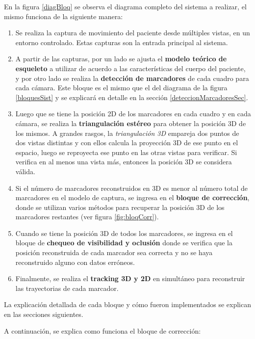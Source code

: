 En la figura \ref{diagBloq} se observa el diagrama completo del sistema a realizar, el mismo funciona de la siguiente manera:
\begin{enumerate}
\item Se realiza la captura de movimiento del paciente desde múltiples vistas, en un entorno controlado. Estas capturas son la entrada principal al sistema.
\item A partir de las capturas, por un lado se ajusta el \textbf{modelo teórico de esqueleto} a utilizar de acuerdo a las características del cuerpo del paciente, y por otro lado se realiza la \textbf{detección de marcadores} de cada cuadro para cada cámara. Este bloque es el mismo que el del diagrama de la figura \ref{bloquesSist} y se explicará en detalle en la sección \ref{deteccionMarcadoresSec}.
\item Luego que se tiene la posición 2D de los marcadores en cada cuadro y en cada cámara, se realiza la \textbf{triangulación estéreo} para obtener la posición 3D de los mismos. A grandes rasgos, la \emph{triangulación 3D} empareja dos puntos de dos vistas distintas y con ellos calcula la proyección 3D de ese punto en el espacio, luego se reproyecta ese punto en las otras vistas para verificar. Si verifica en al menos una vista más, entonces la posición 3D se considera válida.
\item Si el número de marcadores reconstruidos en 3D es menor al número total de marcadores en el modelo de captura, se ingresa en el \textbf{bloque de corrección}, donde se utilizan varios métodos para recuperar la posición 3D de los marcadores restantes (ver figura \ref{fig:bloqCorr}). 
\item Cuando se tiene la posición 3D de todos los marcadores, se ingresa en el bloque de \textbf{chequeo de visibilidad y oclusión} donde se verifica que la posición reconstruida de cada marcador sea correcta y no se haya reconstruido alguno con datos erróneos.
\item Finalmente, se realiza el \textbf{tracking 3D y 2D} en simultáneo para reconstruir las trayectorias de cada marcador.
\end{enumerate}

La explicación detallada de cada bloque y cómo fueron implementados se explican en las secciones siguientes.

A continuación, se explica como funciona el bloque de corrección:

